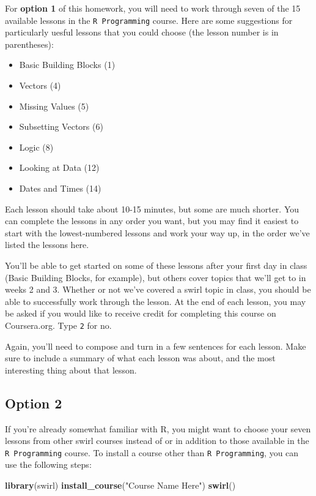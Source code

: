 \documentclass[]{book}
\makeatletter
\newenvironment{Shaded}{\begin{snugshade}}{\end{snugshade}}
\newcommand{\KeywordTok}[1]{\textcolor[rgb]{0.13,0.29,0.53}{\textbf{#1}}}
\newcommand{\StringTok}[1]{\textcolor[rgb]{0.31,0.60,0.02}{#1}}
\newcommand{\NormalTok}[1]{#1}
\providecommand{\tightlist}{%
  \setlength{\itemsep}{0pt}\setlength{\parskip}{0pt}}
\newenvironment{kframe}{%
\medskip{}
\setlength{\fboxsep}{.8em}
 \def\at@end@of@kframe{}%
 \ifinner\ifhmode%
  \def\at@end@of@kframe{\end{minipage}}%
  \begin{minipage}{\columnwidth}%
 \fi\fi%
 \def\FrameCommand##1{\hskip\@totalleftmargin \hskip-\fboxsep
 \colorbox{shadecolor}{##1}\hskip-\fboxsep
     \hskip-\linewidth \hskip-\@totalleftmargin \hskip\columnwidth}%
 \MakeFramed {\advance\hsize-\width
   \@totalleftmargin\z@ \linewidth\hsize
   \@setminipage}}%
 {\par\unskip\endMakeFramed%
 \at@end@of@kframe}
\renewenvironment{Shaded}{\begin{kframe}}{\end{kframe}}
\theoremstyle{definition}
\theoremstyle{definition}
\theoremstyle{definition}
\theoremstyle{remark}
\makeatother
\begin{document}
For \textbf{option 1} of this homework, you will need to work through
seven of the 15 available lessons in the \texttt{R\ Programming} course.
Here are some suggestions for particularly uesful lessons that you could
choose (the lesson number is in parentheses):

\begin{itemize}
\tightlist
\item
  Basic Building Blocks (1)
\item
  Vectors (4)
\item
  Missing Values (5)
\item
  Subsetting Vectors (6)
\item
  Logic (8)
\item
  Looking at Data (12)
\item
  Dates and Times (14)
\end{itemize}

Each lesson should take about 10-15 minutes, but some are much shorter.
You can complete the lessons in any order you want, but you may find it
easiest to start with the lowest-numbered lessons and work your way up,
in the order we've listed the lessons here.

You'll be able to get started on some of these lessons after your first
day in class (Basic Building Blocks, for example), but others cover
topics that we'll get to in weeks 2 and 3. Whether or not we've covered
a swirl topic in class, you should be able to successfully work through
the lesson. At the end of each lesson, you may be asked if you would
like to receive credit for completing this course on Coursera.org. Type
\texttt{2} for no.

Again, you'll need to compose and turn in a few sentences for each
lesson. Make sure to include a summary of what each lesson was about,
and the most interesting thing about that lesson.

\subsection{Option 2}\label{option-2}

If you're already somewhat familiar with R, you might want to choose
your seven lessons from other swirl courses instead of or in addition to
those available in the \texttt{R\ Programming} course. To install a
course other than \texttt{R\ Programming}, you can use the following
steps:

\begin{Shaded}
\begin{Highlighting}[]
\KeywordTok{library}\NormalTok{(swirl)}
\KeywordTok{install_course}\NormalTok{(}\StringTok{"Course Name Here"}\NormalTok{)}
\KeywordTok{swirl}\NormalTok{()}
\end{Highlighting}
\end{Shaded}
\end{document}
